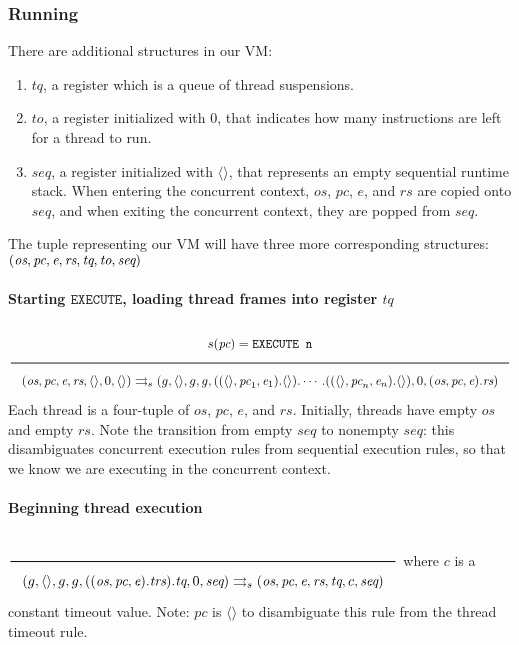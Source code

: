 \subsubsection{Running}
\label{sec:org729f4ea}
There are additional structures in our VM:
\begin{enumerate}
\item \(\textit{tq}\), a register which is a queue of thread suspensions.
\item \(\textit{to}\), a register initialized with \(0\), that indicates how many instructions are left for a thread to run.
\item \(\textit{seq}\), a register initialized with \(\langle \rangle\), that represents an empty sequential runtime stack. When entering the concurrent context, \(\textit{os}\), \(\textit{pc}\), \(\textit{e}\), and \(\textit{rs}\) are copied onto \(\textit{seq}\), and when exiting the concurrent context, they are popped from \(\textit{seq}\).
\end{enumerate}
The tuple representing our VM will have three more corresponding structures:
\((\textit{os}, \textit{pc}, \textit{e}, \textit{rs}, \textit{tq}, \textit{to}, \textit{seq})\\\)

\paragraph{Starting \(\texttt{EXECUTE}\), loading thread frames into register \(\textit{tq}\)}
\label{sec:orgdf43f47}
\(\\\Rule{s(\textit{pc}) = \texttt{EXECUTE n}}{(\textit{os}, \textit{pc}, \textit{e}, \textit{rs}, \langle \rangle, 0, \langle \rangle) \transition (g, \langle \rangle, g, g, ((\langle \rangle, \textit{pc}_1, \textit{e}_1).\langle \rangle). \cdots .((\langle \rangle, \textit{pc}_n, \textit{e}_n).\langle \rangle), 0, (\textit{os}, \textit{pc}, \textit{e}).\textit{rs})}\\\)
Each thread is a four-tuple of \(\textit{os}\), \(\textit{pc}\), \(\textit{e}\), and \(\textit{rs}\). Initially, threads have empty \(\textit{os}\) and empty \(\textit{rs}\). Note the transition from empty \(\textit{seq}\) to nonempty \(\textit{seq}\): this disambiguates concurrent execution rules from sequential execution rules, so that we know we are executing in the concurrent context.

\paragraph{Beginning thread execution}
\label{sec:orgc7b21eb}
\(\\\Rule{}{(g, \langle \rangle, g, g, ((\textit{os}, \textit{pc}, \textit{e}).\textit{trs}).\textit{tq}, 0, \textit{seq}) \transition (\textit{os}, \textit{pc}, \textit{e}, \textit{rs}, \textit{tq}, c, \textit{seq})}\\\)
where \(c\) is a constant timeout value. Note: \(\textit{pc}\) is \(\langle \rangle\) to disambiguate this rule from the thread timeout rule.

